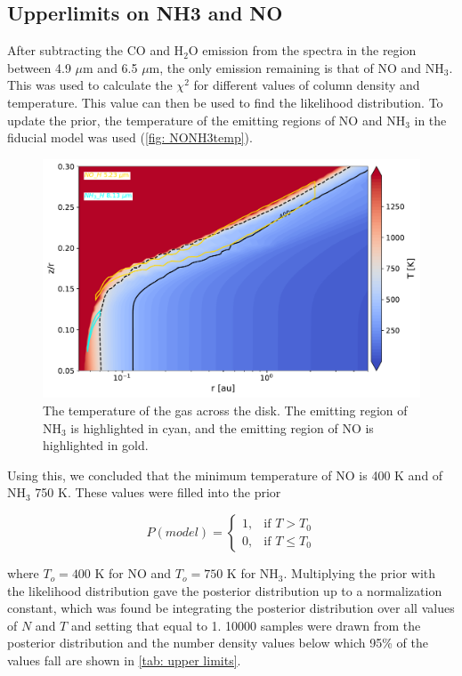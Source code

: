 \documentclass[twoside, single, authoryear, semicolon, 12pt]{lion-msc}
\newcommand{\4}{$_4$}
\newcommand{\3}{$_3$}
\newcommand{\2}{$_2$}
\begin{document}
\subsection{Upperlimits on NH3 and NO}
After subtracting the CO and H\2O emission from the spectra in the region between 4.9 $\mu$m and 6.5 $\mu$m, the only emission remaining is that of NO and NH\3. This was used to calculate the $\chi^2$ for different values of column density and temperature. This value can then be used to find the likelihood distribution. To update the prior, the temperature of the emitting regions of NO and NH\3 in the fiducial model was used (\autoref{fig: NONH3temp}).

\begin{figure}[H]
    \centering
    \includegraphics[width=\linewidth]{Figures/NONH3temp.pdf}
    \caption{The temperature of the gas across the disk. The emitting region of NH\3 is highlighted in cyan, and the emitting region of NO is highlighted in gold.}
    \label{fig: NONH3temp}
\end{figure}

Using this, we concluded that the minimum temperature of NO is 400 K and of NH\3 750 K. These values were filled into the prior

\begin{equation}
    P(model) = 
    \begin{cases}
        1, & \text{if } T > T_0 \\
        0, & \text{if } T \leq T_0
    \end{cases}
\end{equation}

where $T_o=400$ K for NO and $T_o=750$ K for NH\3. Multiplying the prior with the likelihood distribution gave the posterior distribution up to a normalization constant, which was found be integrating the posterior distribution over all values of $N$ and $T$ and setting that equal to 1. 10000 samples were drawn from the posterior distribution and the number density values below which 95\% of the values fall are shown in \autoref{tab: upper limits}.
\end{document}
